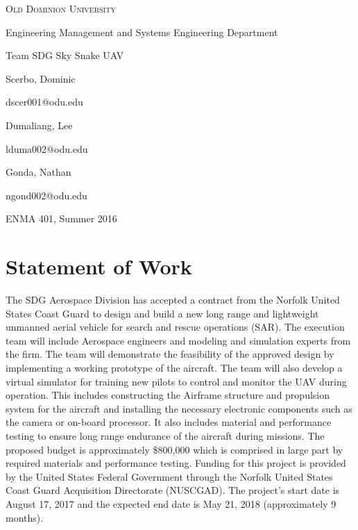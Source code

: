 \documentclass{article}
\begin{document}
\begin{titlepage}

\centering
{\vspace {}}
{\scshape \LARGE Old Dominion University \par \vspace{5cm}}
{\large Engineering Management and Systems Engineering Department \par \vspace{1cm}}
{\large Team SDG Sky Snake UAV \par \vspace{1cm}}

{\normalsize Scerbo, Dominic \par \vspace{0.5cm}}
{\normalsize dscer001@odu.edu \par \vspace{0.5cm}}
{\normalsize Dumaliang, Lee \par \vspace{0.5cm}}
{\normalsize lduma002@odu.edu \par \vspace{0.5cm}}
{\normalsize Gonda, Nathan \par \vspace{0.5cm}}
{\normalsize ngond002@odu.edu \par \vspace{1cm}}

{\large ENMA 401, Summer 2016 \par \vspace{0.5cm}}


\end{titlepage}

\newpage
{}

\section{Statement of Work}
The SDG Aerospace Division has accepted a contract from the Norfolk United States Coast Guard to design and build a new long range and lightweight unmanned aerial vehicle for search and rescue operations (SAR). The execution team will include Aerospace engineers and modeling and simulation experts from the firm. The team will demonstrate the feasibility of the approved design by implementing a working prototype of the aircraft. The team will also develop a virtual simulator for training new pilots to control and monitor the UAV during operation. This includes constructing the Airframe structure and propulsion system for the aircraft and installing the necessary electronic components such as the camera or on-board processor. It also includes material and performance testing to ensure long range endurance of the aircraft during missions. The proposed budget is approximately \$800,000 which is comprised in large part by required materials and performance testing. Funding for this project is provided by the United States Federal Government through the Norfolk United States Coast Guard Acquisition Directorate (NUSCGAD). The project’s start date is August 17, 2017 and the expected end date is May 21, 2018 (approximately 9 months).
\end{document}
